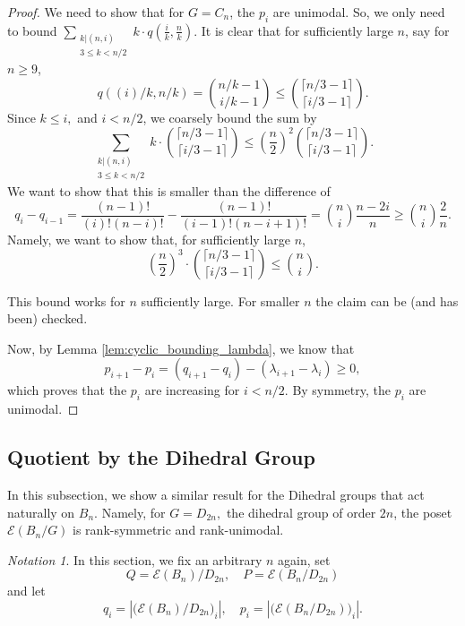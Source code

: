 \documentclass[10 pt]{amsart}
\theoremstyle{plain}
\theoremstyle{definition}
\theoremstyle{remark}
\newtheorem{note}[thm]{Notation}
\numberwithin{equation}{section}
\newcommand\ssec{\subsection}
\begin{document}
\begin{proof}
We need to show that for $G= C_n$, the $p_i$ are unimodal. So, we only need to bound $ \displaystyle \sum_{\substack{k | (n , i)\\ 3 \le k < n/2 }} k \cdot q (\frac{i}{k}, \frac{n}{k}) $. It is clear that for sufficiently large $n$, say for $n \ge 9$, $$q((i)/k, n/k) = {n/k - 1 \choose i/k -1} \le {\lceil n/3-1 \rceil \choose \lceil i/3 -1 \rceil }.$$ Since $k \leq i,$ and $ i < n/2$, we coarsely bound the sum by $$\sum_{\substack{k | (n , i)\\ 3 \le k < n/2 }} k  \cdot {\lceil n/3-1 \rceil \choose \lceil i/3 -1 \rceil } \le \left(\frac{n}{2}\right)^2  {\lceil n/3-1 \rceil \choose \lceil i/3 -1 \rceil }. $$ We want to show that this is smaller than the difference of $$q_i - q_{i-1} = \frac{(n-1)!}{(i)! (n-i)!} - \frac{(n-1)!}{(i-1)!(n-i+1)!}= {n \choose i } \frac{n-2i}{n} \ge  {n \choose i } \frac{2}{n} .$$
Namely, we want to show that, for sufficiently large $n$, 
$$ \left(\frac{n}{2}\right)^3 \cdot {\lceil n/3-1 \rceil \choose \lceil i/3 -1 \rceil }  \le   {n \choose i}.$$

This bound works for $n$ sufficiently large. For smaller $n$ the claim can be (and has been) checked. 

Now, by Lemma \ref{lem:cyclic_bounding_lambda}, we know that $$p_{i+1} - p_{i} =  (q_{i+1} - q_i) - (\lambda_{i+1}- \lambda_i) \ge 0,$$  which proves that the $p_i$ are increasing for $i < n/2$. By symmetry, the $p_i$ are unimodal.
\end{proof}






\ssec{Quotient by the Dihedral Group}
\label{ssec:dihedral}

In this subsection, we show a similar result for the Dihedral groups that act naturally on $B_n$. Namely, for $G = D_{2n},$ the dihedral group of order $2n$, the poset $\mathcal E(B_n/G)$ is rank-symmetric and rank-unimodal.


\begin{note} In this section, we fix an arbitrary $n$ again, set $$Q = \mathcal E (B_n)/D_{2n}, \quad P = \mathcal E(B_n/D_{2n})$$ and let $$q_i = |\big( \mathcal E (B_n)/D_{2n} \big)_i|, \quad p_i = |\big( \mathcal E(B_n/D_{2n}) \big)_i|. $$ 
\end{note}

\building*
\end{document}
